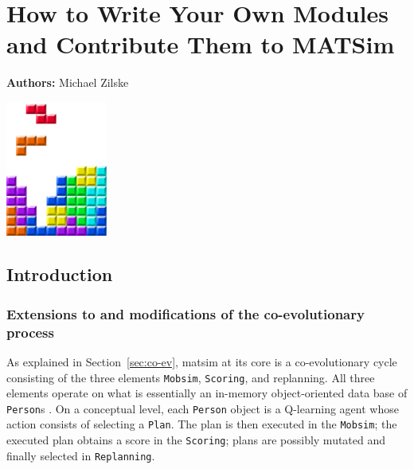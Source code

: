 \chapter{How to Write Your Own Modules and Contribute Them to MATSim }
\label{ch:extensionpoints}
\hfill \textbf{Authors:} Michael Zilske

\begin{center} \includegraphics[width=0.25\textwidth, angle=0]{figures/MATSimBook.png} \end{center}

\section{Introduction}
\label{sec:ownmodules-intro}

\subsection{Extensions to and modifications of the co-evolutionary process}

As explained in Section~\ref{sec:co-ev}, \acrshort{matsim} at its core is a co-evolutionary cycle consisting of the three elements \verb$Mobsim$, \verb$Scoring$, and replanning.  All three elements operate on what is essentially an in-memory object-oriented data base of \verb$Person$s \citep{RaneyNagel2006traf-framework}.  
%
On a conceptual level, each \verb$Person$ object is a Q-learning agent whose action consists of selecting a \verb$Plan$.  The plan is then executed in the \verb$Mobsim$; the executed plan obtains a score in the \verb$Scoring$; plans are possibly mutated and finally selected in \verb$Replanning$.

